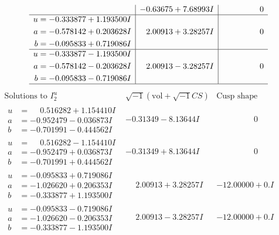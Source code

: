 \documentclass[1p]{elsarticle_modified}
\theoremstyle{definition}
\newcommand{\I}{\sqrt{-1}}
\begin{document}
$$\begin{array}{c|c|c}
 & -0.63675 + 7.68993 I & \phantom{-0.000000 } 0 \\ \hline\begin{aligned}
u &= -0.333877 + 1.193500 I \\
a &= -0.578142 + 0.203628 I \\
b &= -0.095833 + 0.719086 I\end{aligned}
 & \phantom{-}2.00913 + 3.28257 I & \phantom{-0.000000 } 0 \\ \hline\begin{aligned}
u &= -0.333877 - 1.193500 I \\
a &= -0.578142 - 0.203628 I \\
b &= -0.095833 - 0.719086 I\end{aligned}
 & \phantom{-}2.00913 - 3.28257 I & \phantom{-0.000000 } 0\\
 \hline 
 \end{array}$$\newpage$$\begin{array}{c|c|c}  
\text{Solutions to }I^u_{2}& \I (\text{vol} + \sqrt{-1}CS) & \text{Cusp shape}\\
 \hline 
\begin{aligned}
u &= \phantom{-}0.516282 + 1.154410 I \\
a &= -0.952479 - 0.036873 I \\
b &= -0.701991 - 0.444562 I\end{aligned}
 & -0.31349 - 8.13644 I & \phantom{-0.000000 } 0 \\ \hline\begin{aligned}
u &= \phantom{-}0.516282 - 1.154410 I \\
a &= -0.952479 + 0.036873 I \\
b &= -0.701991 + 0.444562 I\end{aligned}
 & -0.31349 + 8.13644 I & \phantom{-0.000000 } 0 \\ \hline\begin{aligned}
u &= -0.095833 + 0.719086 I \\
a &= -1.026620 + 0.206353 I \\
b &= -0.333877 + 1.193500 I\end{aligned}
 & \phantom{-}2.00913 + 3.28257 I & -12.00000 + 0. I\phantom{ +0.000000I} \\ \hline\begin{aligned}
u &= -0.095833 - 0.719086 I \\
a &= -1.026620 - 0.206353 I \\
b &= -0.333877 - 1.193500 I\end{aligned}
 & \phantom{-}2.00913 - 3.28257 I & -12.00000 + 0. I\phantom{ +0.000000I} \\ \hline\begin{aligned}

\end{aligned}
\end{array}$$
\end{document}
